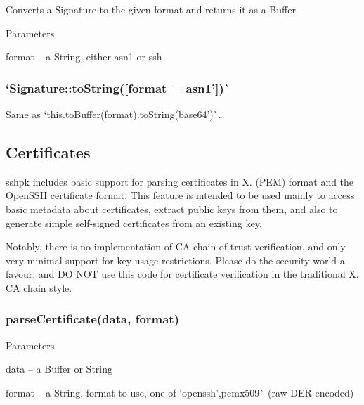 Converts a Signature to the given format and returns it as a Buffer.

Parameters


\begin{DoxyItemize}
\item {\ttfamily format} -- a String, either {\ttfamily asn1} or {\ttfamily ssh}
\end{DoxyItemize}

\subsubsection*{`Signature\+::to\+String(\mbox{[}format = \textquotesingle{}asn1'\mbox{]})\`{}}

Same as `this.\+to\+Buffer(format).to\+String(\textquotesingle{}base64')\`{}.

\subsection*{Certificates}

{\ttfamily sshpk} includes basic support for parsing certificates in X. (P\+EM) format and the Open\+S\+SH certificate format. This feature is intended to be used mainly to access basic metadata about certificates, extract public keys from them, and also to generate simple self-\/signed certificates from an existing key.

Notably, there is no implementation of CA chain-\/of-\/trust verification, and only very minimal support for key usage restrictions. Please do the security world a favour, and DO N\+OT use this code for certificate verification in the traditional X. CA chain style.

\subsubsection*{{\ttfamily parse\+Certificate(data, format)}}

Parameters


\begin{DoxyItemize}
\item {\ttfamily data} -- a Buffer or String
\item {\ttfamily format} -- a String, format to use, one of `\textquotesingle{}openssh'{\ttfamily ,}\textquotesingle{}pem\textquotesingle{}x509\textquotesingle{}\`{} (raw D\+ER encoded)
\end{DoxyItemize}

